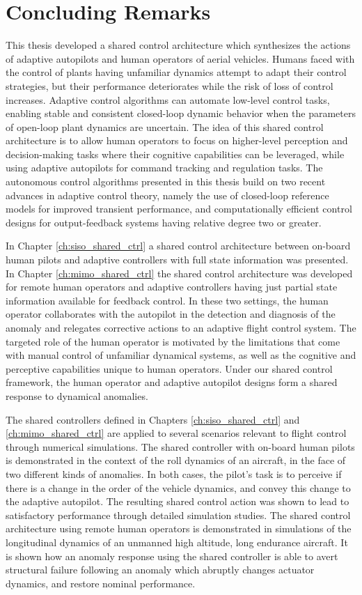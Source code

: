 \chapter{Concluding Remarks} \label{ch:conclusion}
This thesis developed a shared control architecture which synthesizes the actions of adaptive autopilots and human operators of aerial vehicles. Humans faced with the control of plants having unfamiliar dynamics attempt to adapt their control strategies, but their performance deteriorates while the risk of loss of control increases. Adaptive control algorithms can automate low-level control tasks, enabling stable and consistent closed-loop dynamic behavior when the parameters of open-loop plant dynamics are uncertain. The idea of this shared control architecture is to allow human operators to focus on higher-level perception and decision-making tasks where their cognitive capabilities can be leveraged, while using adaptive autopilots for command tracking and regulation tasks. The autonomous control algorithms presented in this thesis build on two recent advances in adaptive control theory, namely the use of closed-loop reference models for improved transient performance, and computationally efficient control designs for output-feedback systems having relative degree two or greater. 

In Chapter \ref{ch:siso_shared_ctrl} a shared control architecture between on-board human pilots and adaptive controllers with full state information was presented. In Chapter \ref{ch:mimo_shared_ctrl} the shared control architecture was developed for remote human operators and adaptive controllers having just partial state information available for feedback control. In these two settings, the human operator collaborates with the autopilot in the detection and diagnosis of the anomaly and relegates corrective actions to an adaptive flight control system. The targeted role of the human operator is motivated by the limitations that come with manual control of unfamiliar dynamical systems, as well as the cognitive and perceptive capabilities unique to human operators. Under our shared control framework, the human operator and adaptive autopilot designs form a shared response to dynamical anomalies. 

The shared controllers defined in Chapters \ref{ch:siso_shared_ctrl} and \ref{ch:mimo_shared_ctrl} are applied to several scenarios relevant to flight control through numerical simulations. The shared controller with on-board human pilots is demonstrated in the context of the roll dynamics of an aircraft, in the face of two different kinds of anomalies. In both cases, the pilot's task is to perceive if there is a change in the order of the vehicle dynamics, and convey this change to the adaptive autopilot. The resulting shared control action was shown to lead to satisfactory performance through detailed simulation studies. The shared control architecture using remote human operators is demonstrated in simulations of the longitudinal dynamics of an unmanned high altitude, long endurance aircraft. It is shown how an anomaly response using the shared controller is able to avert structural failure following an anomaly which abruptly changes actuator dynamics, and restore nominal performance.

